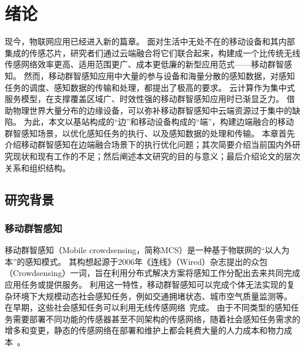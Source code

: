 

\chapter{绪论}


现今，物联网应用已经进入新的篇章。
面对生活中无处不在的移动设备和其内部集成的传感芯片，研究者们通过云端融合将它们联合起来，构建成一个比传统无线传感网络效率更高、适用范围更广、成本更低廉的新型应用范式——移动群智感知。
然而，移动群智感知应用中大量的参与设备和海量分散的感知数据，对感知任务的调度、感知数据的传输和处理，都提出了极高的要求。
云计算作为集中式服务模型，在支撑覆盖区域广、时效性强的移动群智感知应用时已渐显乏力。
借助物理世界大量分布的边缘设备，可以弥补移动群智感知中云端资源过于集中的缺陷。
为此，本文以基站构成的“边”和移动设备构成的“端”，构建边端融合的移动群智感知场景，以优化感知任务的执行、以及感知数据的处理和传输。
本章首先介绍移动群智感知在边端融合场景下的执行优化问题；其次简要介绍当前国内外研究现状和现有工作的不足；然后阐述本文研究的目的与意义；最后介绍论文的层次关系和组织结构。

\section{研究背景}

\subsection{移动群智感知}


移动群智感知（Mobile crowdsensing，简称MCS）是一种基于物联网的“以人为本”的感知模式。
其构想起源于2006年《连线》（Wired）杂志提出的众包（Crowdsensing）一词，旨在利用分布式解决方案将感知工作分配出去来共同完成应用任务或提供服务。
利用这一特性，移动群智感知可以完成个体无法实现的复杂环境下大规模动态社会感知任务，例如交通拥堵状态、城市空气质量监测等。
在早期，这些社会感知任务可以利用无线传感网络~\cite{DBLP:journals/cn/AkyildizSSC02}完成。
由于不同类型的感知任务需要部署不同功能的传感器甚至不同架构的传感网络，随着社会感知任务需求的增多和变更，静态的传感网络在部署和维护上都会耗费大量的人力成本和物力成本~\cite{CNKI/2006/WSNRen}。

